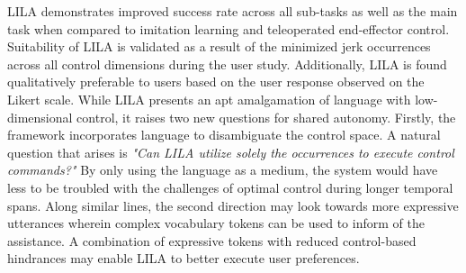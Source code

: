 \documentclass[12pt,letterpaper]{article}
\begin{document}
LILA demonstrates improved success rate across all sub-tasks as well as the main task when compared to imitation learning and teleoperated end-effector control. Suitability of LILA is validated as a result of the minimized jerk occurrences across all control dimensions during the user study. Additionally, LILA is found qualitatively preferable to users based on the user response observed on the Likert scale. While LILA presents an apt amalgamation of language with low-dimensional control, it raises two new questions for shared autonomy. Firstly, the framework incorporates language to disambiguate the control space. A natural question that arises is \textit{"Can LILA utilize solely the occurrences to execute control commands?"} By only using the language as a medium, the system would have less to be troubled with the challenges of optimal control during longer temporal spans. Along similar lines, the second direction may look towards more expressive utterances wherein complex vocabulary tokens can be used to inform of the assistance. A combination of expressive tokens with reduced control-based hindrances may enable LILA to better execute user preferences.
\end{document}
